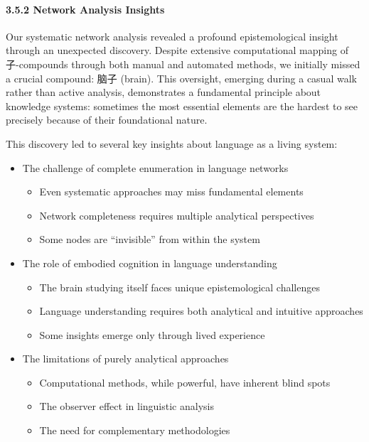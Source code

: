 \documentclass[
]{article}
\providecommand{\tightlist}{%
  \setlength{\itemsep}{0pt}\setlength{\parskip}{0pt}}
\begin{document}
\paragraph{3.5.2 Network Analysis
Insights}\label{network-analysis-insights}

Our systematic network analysis revealed a profound epistemological
insight through an unexpected discovery. Despite extensive computational
mapping of 子-compounds through both manual and automated methods, we
initially missed a crucial compound: 脑子 (brain). This oversight,
emerging during a casual walk rather than active analysis, demonstrates
a fundamental principle about knowledge systems: sometimes the most
essential elements are the hardest to see precisely because of their
foundational nature.

This discovery led to several key insights about language as a living
system:

\begin{itemize}
\tightlist
\item
  The challenge of complete enumeration in language networks

  \begin{itemize}
  \tightlist
  \item
    Even systematic approaches may miss fundamental elements
  \item
    Network completeness requires multiple analytical perspectives
  \item
    Some nodes are ``invisible'' from within the system
  \end{itemize}
\item
  The role of embodied cognition in language understanding

  \begin{itemize}
  \tightlist
  \item
    The brain studying itself faces unique epistemological challenges
  \item
    Language understanding requires both analytical and intuitive
    approaches
  \item
    Some insights emerge only through lived experience
  \end{itemize}
\item
  The limitations of purely analytical approaches

  \begin{itemize}
  \tightlist
  \item
    Computational methods, while powerful, have inherent blind spots
  \item
    The observer effect in linguistic analysis
  \item
    The need for complementary methodologies
  \end{itemize}
\end{itemize}
\end{document}
